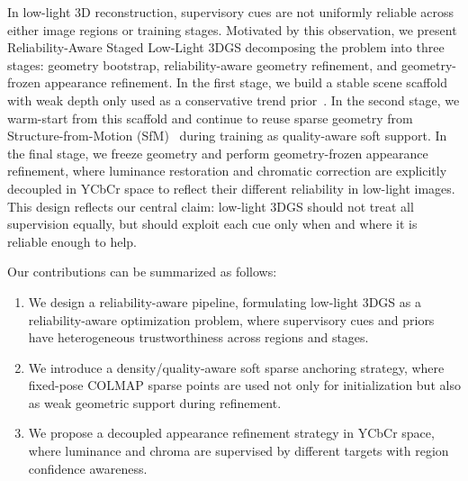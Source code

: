 In low-light 3D reconstruction, supervisory cues are not uniformly reliable
across either image regions or training stages. Motivated by this
observation, we present Reliability-Aware Staged Low-Light 3DGS decomposing
the problem into three stages: geometry bootstrap, reliability-aware geometry
refinement, and geometry-frozen appearance refinement. In the first stage, we build a
stable scene scaffold with weak depth only used as a conservative trend
prior~\cite{marigold}. In the second stage, we warm-start from this scaffold
and continue to reuse sparse geometry from Structure-from-Motion
(SfM)~\cite{sfm_revisited} during training as quality-aware soft support.
In the final stage, we freeze geometry and perform geometry-frozen appearance
refinement, where luminance restoration and chromatic correction are explicitly
decoupled in YCbCr space to reflect their different reliability in low-light
images. This design reflects our central claim: low-light 3DGS should not
treat all supervision equally, but should exploit each cue only when and
where it is reliable enough to help.

Our contributions can be summarized as follows:

\begin{enumerate}
    \item We design a reliability-aware pipeline, formulating low-light 3DGS
    as a reliability-aware optimization problem, where supervisory cues and
    priors have heterogeneous trustworthiness across regions and stages.

    \item We introduce a density/quality-aware soft sparse anchoring
    strategy, where fixed-pose COLMAP sparse points are used not only for
    initialization but also as weak geometric support during refinement.

    \item We propose a decoupled appearance refinement strategy in YCbCr
    space, where luminance and chroma are supervised by different
    targets with region confidence awareness.
\end{enumerate}
